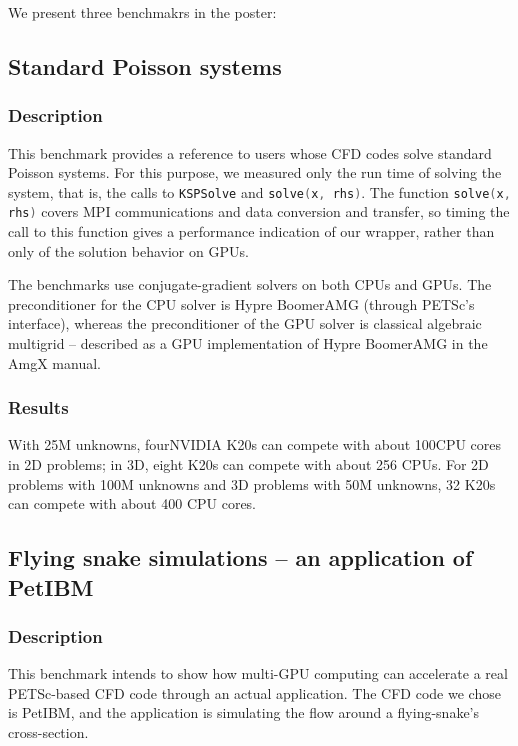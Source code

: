 We present three benchmakrs in the poster:

\subsection{Standard Poisson systems}

    \subsubsection{Description}
    This benchmark provides a reference to users whose CFD codes solve standard Poisson systems.
    For this purpose, we measured only the run time of solving the system, that is, the calls to
    \lstinline[language=C++, basicstyle=\ttfamily]|KSPSolve| and
    \lstinline[language=C++, basicstyle=\ttfamily]|solve(x, rhs)|.
    The  function \lstinline[language=C++, basicstyle=\ttfamily]|solve(x, rhs)|
    covers MPI communications and data conversion and transfer,
    so timing the call to this
    function gives a performance indication of our wrapper, rather than only 
    of the solution behavior on GPUs.

    The benchmarks use conjugate-gradient solvers on both CPUs and GPUs.
    The preconditioner for the CPU solver is Hypre BoomerAMG 
    (through PETSc's interface),
    whereas the preconditioner of the GPU solver is classical algebraic multigrid -- 
    described as a GPU implementation of Hypre BoomerAMG in the AmgX
    manual\cite[see][p.130]{amgx-manual}.

    \subsubsection{Results}
    With 25M unknowns,
    four\footnotemark[2] NVIDIA K20s can compete with about 100\footnotemark[3] 
    CPU cores in 2D problems;
    in 3D, eight K20s can compete with about 256 CPUs.
    For 2D problems with 100M unknowns and 3D problems with 50M unknowns,
    32 K20s can compete with about 400 CPU cores.

\subsection{Flying snake simulations -- an application of PetIBM}

    \subsubsection{Description}
    This benchmark intends to show how multi-GPU computing can accelerate a real
    PETSc-based CFD code through an actual application.
    The CFD code we chose is PetIBM\cite{petibm-repo}, 
    and the application is simulating the flow around a flying-snake's cross-section\cite{Krishnan-2013-ID33}.

